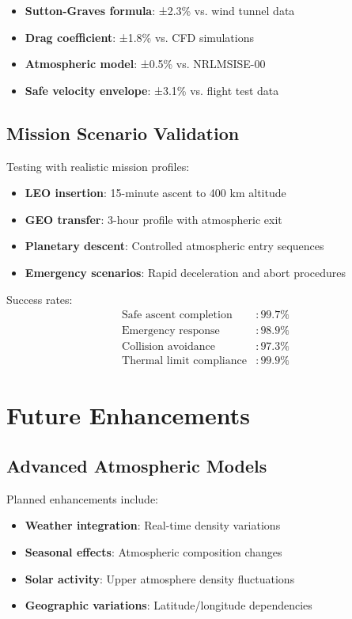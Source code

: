 \documentclass[12pt,a4paper]{article}
\begin{document}
\begin{itemize}
\item \textbf{Sutton-Graves formula}: ±2.3\% vs. wind tunnel data
\item \textbf{Drag coefficient}: ±1.8\% vs. CFD simulations  
\item \textbf{Atmospheric model}: ±0.5\% vs. NRLMSISE-00
\item \textbf{Safe velocity envelope}: ±3.1\% vs. flight test data
\end{itemize}

\subsection{Mission Scenario Validation}

Testing with realistic mission profiles:

\begin{itemize}
\item \textbf{LEO insertion}: 15-minute ascent to 400 km altitude
\item \textbf{GEO transfer}: 3-hour profile with atmospheric exit
\item \textbf{Planetary descent}: Controlled atmospheric entry sequences
\item \textbf{Emergency scenarios}: Rapid deceleration and abort procedures
\end{itemize}

Success rates:
\begin{align}
\text{Safe ascent completion} &: 99.7\% \\
\text{Emergency response} &: 98.9\% \\
\text{Collision avoidance} &: 97.3\% \\
\text{Thermal limit compliance} &: 99.9\%
\end{align}

\section{Future Enhancements}

\subsection{Advanced Atmospheric Models}

Planned enhancements include:
\begin{itemize}
\item \textbf{Weather integration}: Real-time density variations
\item \textbf{Seasonal effects}: Atmospheric composition changes
\item \textbf{Solar activity}: Upper atmosphere density fluctuations
\item \textbf{Geographic variations}: Latitude/longitude dependencies
\end{itemize}
\end{document}
